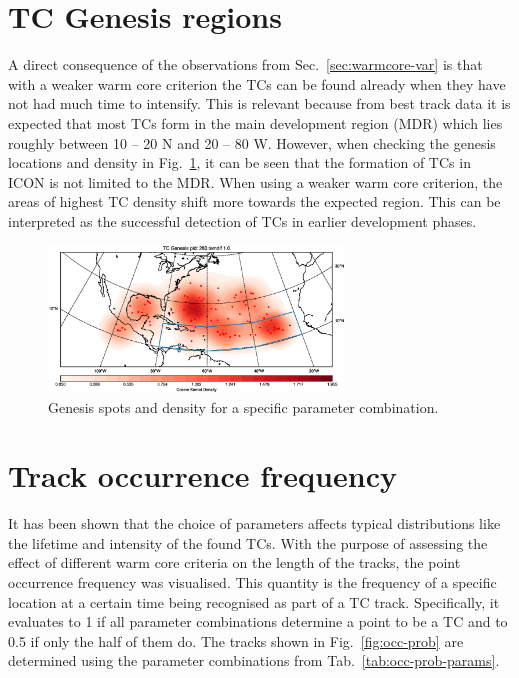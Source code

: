 \section{TC Genesis regions}
A direct consequence of the observations from Sec.~\ref{sec:warmcore-var} is that with a weaker warm core criterion the TCs can be found already when they have not had much time to intensify. This is relevant because from best track data it is expected that most TCs form in the main development region (MDR) which lies roughly between 10 -- 20 \degree N and 20 -- 80 \degree W. However, when checking the genesis locations and density in Fig.~\ref{fig:genesis-temdif1}, it can be seen that the formation of TCs in ICON is not limited to the MDR. When using a weaker warm core criterion, the areas of highest TC density shift more towards the expected region. This can be interpreted as the successful detection of TCs in earlier development phases.
\begin{figure}[!htb]
	\centering
	\includegraphics[width=0.7\textwidth]{img/genesis_plot_temdif1.eps}
	\caption{Genesis spots and density for a specific parameter combination.}
	\label{fig:genesis-temdif1}
\end{figure}

\section{Track occurrence frequency }
It has been shown that the choice of parameters affects typical distributions like the lifetime and intensity of the found TCs. With the purpose of assessing the effect of different warm core criteria on the length of the tracks, the point occurrence frequency was visualised. This quantity is the frequency of a specific location at a certain time being recognised as part of a TC track. Specifically, it evaluates to 1 if all parameter combinations determine a point to be a TC and to 0.5 if only the half of them do. The tracks shown in Fig.~\ref{fig:occ-prob} are determined using the parameter combinations from Tab.~\ref{tab:occ-prob-params}.

